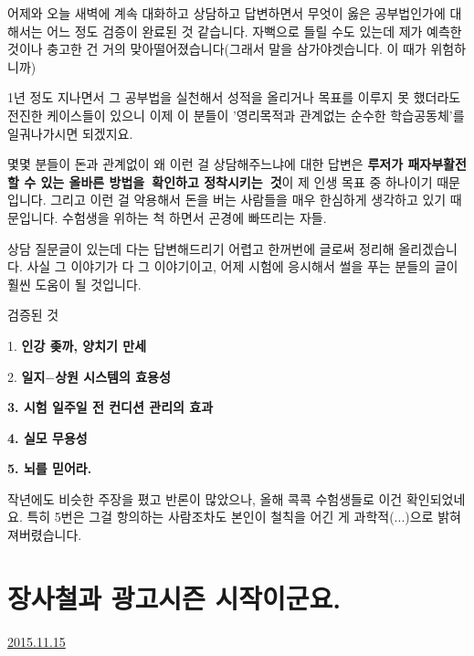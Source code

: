 \vspace{5mm}

어제와 오늘 새벽에 계속 대화하고 상담하고 답변하면서
무엇이 옳은 공부법인가에 대해서는 어느 정도 검증이 완료된 것 같습니다.
자뻑으로 들릴 수도 있는데 제가 예측한 것이나 충고한 건 거의 맞아떨어졌습니다(그래서 말을 삼가야겟습니다. 이 때가 위험하니까)
\vspace{5mm}

1년 정도 지나면서 그 공부법을 실천해서 성적을 올리거나
목표를 이루지 못 했더라도 전진한 케이스들이 있으니 이제 이 분들이 '영리목적과 관계없는 순수한 학습공동체'를 일궈나가시면 되겠지요.
\vspace{5mm}

몇몇 분들이 돈과 관계없이 왜 이런 걸 상담해주느냐에 대한 답변은
\textbf{루저가 패자부활전 할 수 있는 올바른 방법을 확인하고 정착시키는 것}이 제 인생 목표 중 하나이기 때문입니다.
그리고 이런 걸 악용해서 돈을 버는 사람들을 매우 한심하게 생각하고 있기 때문입니다. 수험생을 위하는 척 하면서 곤경에 빠뜨리는 자들.
\vspace{5mm}

상담 질문글이 있는데 다는 답변해드리기 어렵고 한꺼번에 글로써 정리해 올리겠습니다.
사실 그 이야기가 다 그 이야기이고,
어제 시험에 응시해서 썰을 푸는 분들의 글이 훨씬 도움이 될 것입니다.
\vspace{5mm}

검증된 것
\vspace{5mm}

\item 1. \textbf{인강 좆까, 양치기 만세}
\item 2. \textbf{일지$-$상원 시스템의 효용성}
\item \textbf{3. 시험 일주일 전 컨디션 관리의 효과}
\item \textbf{4. 실모 무용성}
\item \textbf{5. 뇌를 믿어라.}
\vspace{5mm}

작년에도 비슷한 주장을 폈고 반론이 많았으나, 올해 콕콕 수험생들로 이건 확인되었네요.
특히 5번은 그걸 항의하는 사람조차도 본인이 철칙을 어긴 게 과학적(...)으로 밝혀져버렸습니다.
\vspace{5mm}






\section{장사철과 광고시즌 시작이군요.}
\href{https://www.kockoc.com/Apoc/489593}{2015.11.15}

